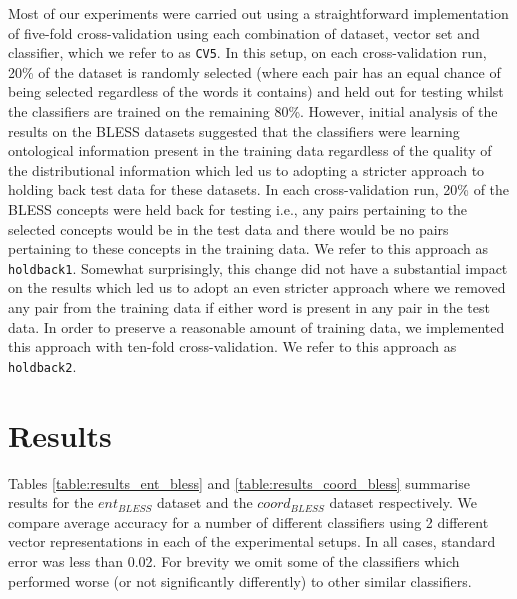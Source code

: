 \documentclass[11pt]{article}
\begin{document}
Most of our experiments were carried out using a straightforward implementation of five-fold cross-validation using each combination of dataset, vector set and classifier, which we refer to as \texttt{CV5}.  In this setup, on each cross-validation run, 20\% of the dataset is randomly selected (where each pair has an equal chance of being selected regardless of the words it contains) and held out for testing whilst the classifiers are trained on the remaining 80\%.  However, initial analysis of the results on the BLESS datasets suggested that the classifiers were learning ontological information present in the training data regardless of the quality of the distributional information which led us to adopting a stricter approach to holding back test data for these datasets.  In each cross-validation run, 20\% of the BLESS concepts were held back for testing i.e., any pairs pertaining to the selected concepts would be in the test data and there would be no pairs pertaining to these concepts in the training data.  We refer to this approach as \texttt{holdback1}.  Somewhat surprisingly, this change did not have a substantial impact on the results which led us to adopt an even stricter approach where we removed any pair from the training data if either word is present in any pair in the test data.  In order to preserve a reasonable amount of training data, we implemented this approach with ten-fold cross-validation.  We refer to this approach as \texttt{holdback2}.

\section{Results}
\label{sect:results}

Tables \ref{table:results_ent_bless} and \ref{table:results_coord_bless} summarise results for the $ent_{BLESS}$ dataset and the $coord_{BLESS}$ dataset respectively.  We compare average accuracy for a number of different classifiers using 2 different vector representations in each of the experimental setups.  In all cases, standard error was less than 0.02.  For brevity we omit some of the classifiers which performed worse (or not significantly differently) to other similar classifiers.
\end{document}
